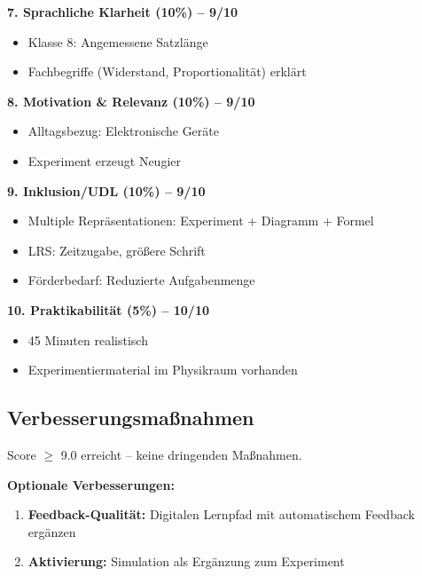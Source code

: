 \documentclass[11pt,a4paper]{article}
\begin{document}
\textbf{7. Sprachliche Klarheit (10\%) -- 9/10}
\begin{itemize}
    \item Klasse 8: Angemessene Satzlänge
    \item Fachbegriffe (Widerstand, Proportionalität) erklärt
\end{itemize}

\textbf{8. Motivation \& Relevanz (10\%) -- 9/10}
\begin{itemize}
    \item Alltagsbezug: Elektronische Geräte
    \item Experiment erzeugt Neugier
\end{itemize}

\textbf{9. Inklusion/UDL (10\%) -- 9/10}
\begin{itemize}
    \item Multiple Repräsentationen: Experiment + Diagramm + Formel
    \item LRS: Zeitzugabe, größere Schrift
    \item Förderbedarf: Reduzierte Aufgabenmenge
\end{itemize}

\textbf{10. Praktikabilität (5\%) -- 10/10}
\begin{itemize}
    \item 45 Minuten realistisch
    \item Experimentiermaterial im Physikraum vorhanden
\end{itemize}

\subsection{Verbesserungsmaßnahmen}
Score $\geq$ 9.0 erreicht -- keine dringenden Maßnahmen.

\textbf{Optionale Verbesserungen:}
\begin{enumerate}
    \item \textbf{Feedback-Qualität:} Digitalen Lernpfad mit automatischem Feedback ergänzen
    \item \textbf{Aktivierung:} Simulation als Ergänzung zum Experiment
\end{enumerate}

\end{document}
